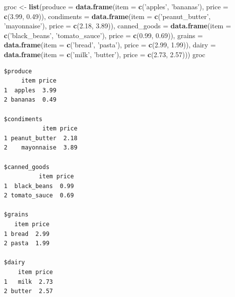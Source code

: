 \documentclass[
]{article}
\newenvironment{Shaded}{\begin{snugshade}}{\end{snugshade}}
\newcommand{\DataTypeTok}[1]{\textcolor[rgb]{0.13,0.29,0.53}{#1}}
\newcommand{\FloatTok}[1]{\textcolor[rgb]{0.00,0.00,0.81}{#1}}
\newcommand{\KeywordTok}[1]{\textcolor[rgb]{0.13,0.29,0.53}{\textbf{#1}}}
\newcommand{\NormalTok}[1]{#1}
\newcommand{\StringTok}[1]{\textcolor[rgb]{0.31,0.60,0.02}{#1}}
\begin{document}
\begin{Shaded}
\begin{Highlighting}[]
\NormalTok{groc <-}\StringTok{ }\KeywordTok{list}\NormalTok{(}\DataTypeTok{produce =} \KeywordTok{data.frame}\NormalTok{(}\DataTypeTok{item =} \KeywordTok{c}\NormalTok{(}\StringTok{'apples'}\NormalTok{, }\StringTok{'bananas'}\NormalTok{),}
                                  \DataTypeTok{price =} \KeywordTok{c}\NormalTok{(}\FloatTok{3.99}\NormalTok{, }\FloatTok{0.49}\NormalTok{)),}
             \DataTypeTok{condiments =} \KeywordTok{data.frame}\NormalTok{(}\DataTypeTok{item =} \KeywordTok{c}\NormalTok{(}\StringTok{'peanut_butter'}\NormalTok{, }\StringTok{'mayonnaise'}\NormalTok{),}
                                     \DataTypeTok{price =} \KeywordTok{c}\NormalTok{(}\FloatTok{2.18}\NormalTok{, }\FloatTok{3.89}\NormalTok{)),}
             \DataTypeTok{canned_goods =} \KeywordTok{data.frame}\NormalTok{(}\DataTypeTok{item =} \KeywordTok{c}\NormalTok{(}\StringTok{'black_beans'}\NormalTok{, }\StringTok{'tomato_sauce'}\NormalTok{),}
                                       \DataTypeTok{price =} \KeywordTok{c}\NormalTok{(}\FloatTok{0.99}\NormalTok{, }\FloatTok{0.69}\NormalTok{)),}
             \DataTypeTok{grains =} \KeywordTok{data.frame}\NormalTok{(}\DataTypeTok{item =} \KeywordTok{c}\NormalTok{(}\StringTok{'bread'}\NormalTok{, }\StringTok{'pasta'}\NormalTok{),}
                                 \DataTypeTok{price =} \KeywordTok{c}\NormalTok{(}\FloatTok{2.99}\NormalTok{, }\FloatTok{1.99}\NormalTok{)),}
             \DataTypeTok{dairy =} \KeywordTok{data.frame}\NormalTok{(}\DataTypeTok{item =} \KeywordTok{c}\NormalTok{(}\StringTok{'milk'}\NormalTok{, }\StringTok{'butter'}\NormalTok{),}
                                \DataTypeTok{price =} \KeywordTok{c}\NormalTok{(}\FloatTok{2.73}\NormalTok{, }\FloatTok{2.57}\NormalTok{)))}
\NormalTok{groc}
\end{Highlighting}
\end{Shaded}

\begin{verbatim}
$produce
     item price
1  apples  3.99
2 bananas  0.49

$condiments
           item price
1 peanut_butter  2.18
2    mayonnaise  3.89

$canned_goods
          item price
1  black_beans  0.99
2 tomato_sauce  0.69

$grains
   item price
1 bread  2.99
2 pasta  1.99

$dairy
    item price
1   milk  2.73
2 butter  2.57
\end{verbatim}
\end{document}
